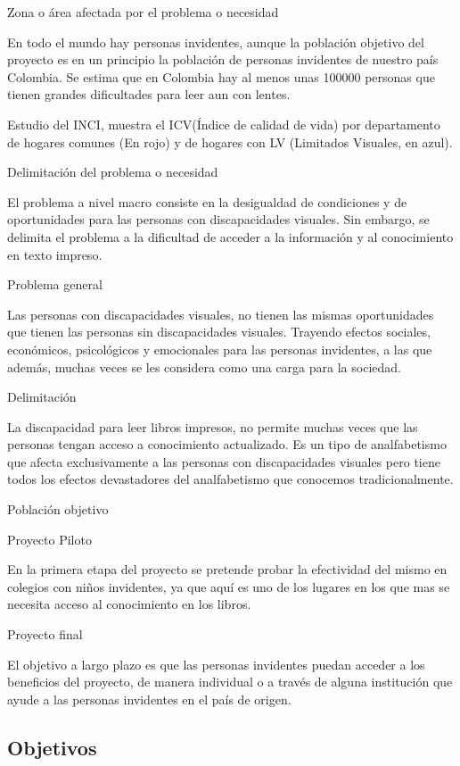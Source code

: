 \documentclass[a4paper, 12pt, oneside]{article}
\begin{document}
Zona o área afectada por el problema o necesidad

En todo el mundo hay personas invidentes, aunque la población objetivo del proyecto es en un principio la población de personas invidentes de nuestro país Colombia. Se estima que en Colombia hay al menos unas 100000 personas que tienen grandes dificultades para leer aun con lentes.


Estudio del INCI, muestra el ICV(Índice de calidad de vida) por departamento de hogares comunes (En rojo) y de hogares con LV (Limitados Visuales, en azul).

Delimitación del problema o necesidad

El problema a nivel macro consiste en la desigualdad de condiciones y de oportunidades para las personas con discapacidades visuales. Sin embargo, se delimita el problema a la dificultad de acceder a la información y al conocimiento en texto impreso.

Problema general 

Las personas con discapacidades visuales, no tienen las mismas oportunidades que tienen las personas sin discapacidades visuales. Trayendo efectos 
sociales, económicos, psicológicos y emocionales para las personas invidentes, a las que además, muchas veces se les considera como una carga para la sociedad.

Delimitación

La discapacidad para leer libros impresos, no permite muchas veces que las personas tengan acceso a conocimiento actualizado. Es un tipo de analfabetismo que afecta exclusivamente a las personas con discapacidades visuales pero tiene todos los efectos devastadores del analfabetismo que conocemos tradicionalmente.


Población objetivo

Proyecto Piloto 

En la primera etapa del proyecto se pretende probar la efectividad del mismo en colegios con niños invidentes, ya que aquí es uno de los lugares en los que mas se necesita acceso al conocimiento en los libros.

Proyecto final 

El objetivo a largo plazo es que las personas invidentes puedan acceder a los beneficios del proyecto, de manera individual o a través de alguna institución que ayude a las personas invidentes en el país de origen.

\clearpage

	\begin{center}
	\section{Objetivos}
	\end{center}
\end{document}
